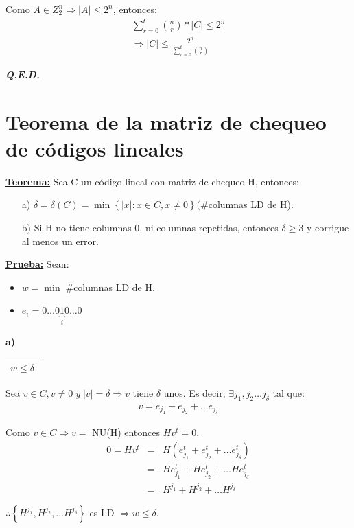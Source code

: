 \documentclass[12pt,a4paper]{report}
\newcounter{neq}
\newcommand{\QED}{\hfill \textit{\textbf{Q.E.D.}}}
\begin{document}
  			\par Como $A \in Z_{2}^{n} \Rightarrow \lvert A\rvert \leq 2^{n}$, entonces:
  			\begin{eqnarray}
  				\nonumber \sum_{r = 0}^{t} {n \choose r} * \lvert C \rvert \leq 2^{n} \\
  				\nonumber \Rightarrow \lvert C \rvert \leq \frac{2^{n}}{\sum_{r = 0}^{t} {n \choose r}}
  			\end{eqnarray}

  		\QED

  	\section{Teorema de la matriz de chequeo de códigos lineales}
  		\textbf{\underline{Teorema:}} Sea C un código lineal con matriz de chequeo H, entonces:
  			\begin{itemize}
  				\item[a)] $\delta = \delta(C) = \min \left\lbrace \lvert x \rvert : x \in C , x \neq 0 \right\rbrace (\#$columnas LD de H).
  				\item[b)] Si H no tiene columnas 0, ni columnas repetidas, entonces $\delta \geq 3$ y corrigue al menos un error.
  			\end{itemize}

  		\textbf{\underline{Prueba:}} Sean:
  			\begin{itemize}
  				\item $w = \min \; \#$columnas LD de H.
  				\item $e_{i} = 0 \dotsc 0 \underbrace{1}_{i} 0 \dotsc 0$
  			\end{itemize}

  			\textbf{a)}

  			\begin{tabular}{|c|} \hline $w \leq \delta \; $ \\\hline \end{tabular}
  			\vspace{3mm}
  			\par Sea $v \in C , v \neq 0 \; y \; \lvert v \rvert = \delta \Rightarrow v$ tiene $\delta$ unos. Es decir; $\exists j_{1}, j_{2} \dotsc j_{\delta}$ tal que:
  			\begin{eqnarray}
  				\nonumber v = e_{j_{1}} + e_{j_{2}} + \dotsc e_{j_{\delta}}
  			\end{eqnarray}

  			\par Como $ v \in C \Rightarrow v =$ NU(H) entonces $Hv^{t} = 0$.
  			\begin{eqnarray}
  				\nonumber 0 = Hv^{t} &=& H(e_{j_{1}}^{t} + e_{j_{2}}^{t} + \dotsc e_{j_{\delta}}^{t}) \\
  				\nonumber &=& H e_{j_{1}}^{t} + H e_{j_{2}}^{t} + \dotsc H e_{j_{\delta}}^{t} \\
  				\nonumber &=& H^{j_{1}} + H^{j_{2}} + \dotsc H^{j_{\delta}}
  			\end{eqnarray}
  			\par $\therefore \left\lbrace H^{j_{1}}, H^{j_{2}}, \dotsc H^{j_{\delta}} \right\rbrace$ es LD $\Rightarrow w \leq \delta$.
\end{document}
